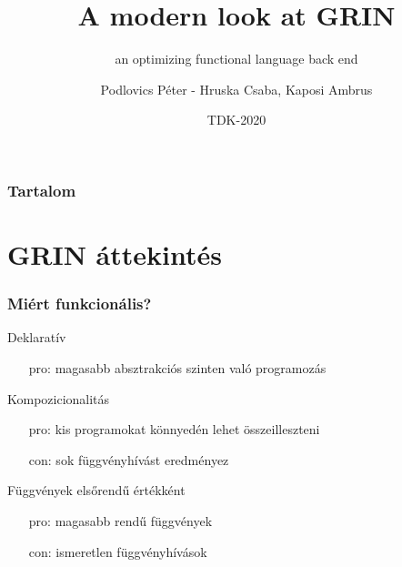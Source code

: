 \documentclass[bigger]{beamer}
\title[GRIN] %
{A modern look at GRIN}
\subtitle{an optimizing functional language back end}
\author[P. Podlovics, Cs. Hruska, Andor Pénzes ] %
{Podlovics P\'eter - Hruska Csaba, Kaposi Ambrus}
\institute[ELTE] %
{
	Eötvös Loránd Tudom\'anyegyetem \\ Budapest
}
\date{TDK-2020} %
\begin{document}
	
{
	\frame{\vspace{15mm}\titlepage}
}

\begin{frame}
	\frametitle{Tartalom}
	\tableofcontents
\end{frame}


\section{GRIN \'attekint\'es}

\begin{frame}[fragile]
	\frametitle{Mi\'ert funkcion\'alis?}
	
	\begin{vfitemize}
		\item Deklarat\'iv
			\begin{itemize}
				\item[pro:] magasabb absztrakci\'os szinten val\'o programoz\'as
			\end{itemize}
		\item Kompozicionalit\'as \\
			\begin{itemize}
				\item[pro:] kis programokat k\"onnyed\'en lehet \"osszeilleszteni
				\item[con:] sok f\"uggv\'enyh\'iv\'ast eredm\'enyez
			\end{itemize}
		\item F\"uggv\'enyek elsőrendű \'ert\'ekk\'ent
			\begin{itemize}
				\item[pro:] magasabb rendű függvények
				\item[con:] ismeretlen függvényhívások
			\end{itemize}
	\end{vfitemize}

\end{frame}
\end{document}
